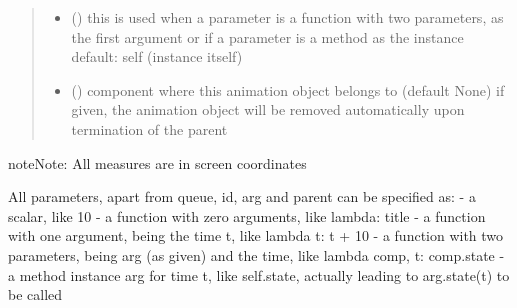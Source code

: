 \documentclass[letterpaper,10pt,english]{sphinxmanual}
\begin{document}
\begin{fulllineitems}
\begin{quote}
\begin{description}
\begin{itemize}
\item {} 
 () \textendash{} this is used when a parameter is a function with two parameters, as the first argument or
if a parameter is a method as the instance 
default: self (instance itself)

\item {} 
 ({\hyperref[\detokenize{Reference:salabim.Component}]{}}) \textendash{} component where this animation object belongs to (default None) 
if given, the animation object will be removed
automatically upon termination of the parent

\end{itemize}

\end{description}\end{quote}

\begin{sphinxadmonition}{note}{Note:}
All measures are in screen coordinates 

All parameters, apart from queue, id, arg and parent can be specified as: 
- a scalar, like 10 
- a function with zero arguments, like lambda: title 
- a function with one argument, being the time t, like lambda t: t + 10 
- a function with two parameters, being arg (as given) and the time, like lambda comp, t: comp.state 
- a method instance arg for time t, like self.state, actually leading to arg.state(t) to be called
\end{sphinxadmonition}

\end{fulllineitems}

\end{document}
